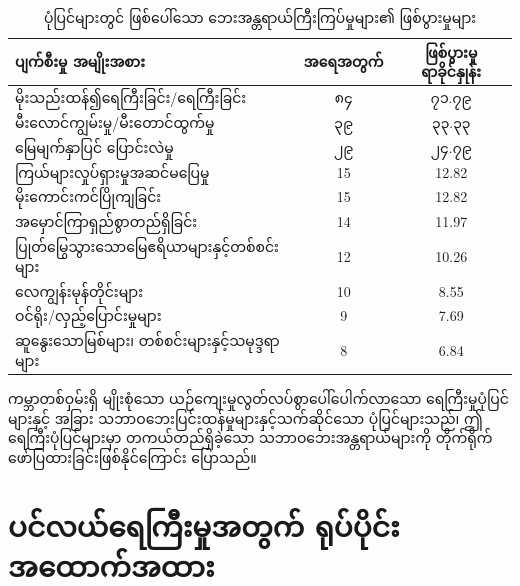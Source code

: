 \documentclass[10pt,twocolumn,letterpaper]{article}
\begin{document}
\begin{table}[ht]
\begin{center}
\renewcommand{\arraystretch}{1.2}  %
\begin{tabular}{|l|c|c|}
\hline
\textbf{ပျက်စီးမှု အမျိုးအစား} & \textbf{အရေအတွက်} & \textbf{ဖြစ်ပွားမှုရာခိုင်နှုန်း} \\
\hline\hline
မိုးသည်းထန်၍ရေကြီးခြင်း/ရေကြီးခြင်း            & ၈၄ & ၇၁.၇၉ \\
မီးလောင်ကျွမ်းမှု/မီးတောင်ထွက်မှု & ၃၉ & ၃၃.၃၃ \\
မြေမျက်နှာပြင် ပြောင်းလဲမှု   & ၂၉ & ၂၄.၇၉ \\
ကြယ်များလှုပ်ရှားမှုအဆင်မပြေမှု           & 15 & 12.82 \\
မိုးကောင်းကင်ပြိုကျခြင်း           & 15 & 12.82 \\
အမှောင်ကြာရှည်စွာတည်ရှိခြင်း      & 14 & 11.97 \\
ပြုတ်မြွေသွားသောမြေဧရိယာများနှင့်တစ်စင်းများ    & 12 & 10.26 \\
လေကျွန်းမုန်တိုင်းများ          & 10 & 8.55  \\
ဝင်ရိုး/လှည့်ပြောင်းမှုများ & 9 & 7.69  \\
ဆူနွေးသောမြစ်များ၊ တစ်စင်းများနှင့်သမုဒ္ဒရာများ & 8 & 6.84 \\
\hline
\end{tabular}
\end{center}
\caption{ပုံပြင်များတွင် ဖြစ်ပေါ်သော ဘေးအန္တရာယ်ကြီးကြပ်မှုများ၏ ဖြစ်ပွားမှုများ}
\label{tab: 1}
\end{table}

ကမ္ဘာတစ်ဝှမ်းရှိ မျိုးစုံသော ယဉ်ကျေးမှုလွတ်လပ်စွာပေါ်ပေါက်လာသော ရေကြီးမှုပုံပြင်များနှင့် အခြား သဘာဝဘေးပြင်းထန်မှုများနှင့်သက်ဆိုင်သော ပုံပြင်များသည်၊ ဤရေကြီးပုံပြင်များမှာ တကယ်တည်ရှိခဲ့သော သဘာဝဘေးအန္တရာယ်များကို တိုက်ရိုက်ဖော်ပြထားခြင်းဖြစ်နိုင်ကြောင်း ပြောသည်။

\section{ပင်လယ်ရေကြီးမှုအတွက် ရုပ်ပိုင်းအထောက်အထား}
\end{document}
